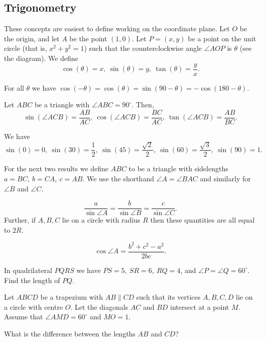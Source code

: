 \subsection{Trigonometry}
These concepts are easiest to define working on the coordinate plane. Let $O$ be
the origin, and let $A$ be the point $(1,0)$. 
Let $P=(x,y)$ be a point on the unit circle (that is, $x^2+y^2=1$) such that
the counterclockwise angle $\angle AOP$ is $\theta$ (see the diagram). We define
\[\cos(\theta)=x,\ \sin(\theta)=y,\ \tan(\theta)=\frac yx.\]
\begin{result}{\label{r:b:g:t:1}}
  For all $\theta$ we have
  $\cos(-\theta)=\cos(\theta)=\sin(90-\theta)=-\cos(180-\theta)$.
\end{result}
\begin{result}{\label{r:b:g:t:2}}
  Let $ABC$ be a triangle with $\angle ABC=90^\circ$. Then,
  \[\sin(\angle ACB)=\frac{AB}{AC},\ \cos(\angle ACB)=\frac{BC}{AC},\
    \tan(\angle ACB)=\frac{AB}{BC}.\]
\end{result}
\begin{result}{\label{r:b:g:t:3}}
  We have
  \[\sin(0)=0,\ \sin(30)=\frac 12,\ \sin(45)=\frac{\sqrt2}2,\
    \sin(60)=\frac{\sqrt3}2,\ \sin(90)=1.\]
\end{result}
For the next two results we define $ABC$ to be a triangle with sidelengths
$a=BC,\ b=CA,\ c=AB$. We use the shorthand $\angle A=\angle BAC$ and similarly
for $\angle B$ and $\angle C$.
\begin{result}[Extended Rule of Sines]{\label{r:b:g:t:4}}
  \[\frac a{\sin \angle A}=\frac b{\sin\angle B}=\frac c{\sin\angle C}.\]
  Further, if $A,B,C$ lie on a circle with radius $R$ then these quantities are
  all equal to $2R$.
\end{result}
\begin{result}{\label{r:b:g:t:5}}
  \[\cos\angle A=\frac{b^2+c^2-a^2}{2bc}.\]
\end{result}
\begin{problem}{\label{p:b:g:t:1}}
 In quadrilateral $PQRS$ we have $PS=5,\ SR=6,\ RQ=4$, and $\angle P=\angle
 Q=60^\circ$. Find the length of $PQ$.
\end{problem}
\begin{problem}{\label{p:b:g:t:2}}
  Let $ABCD$ be a trapezium with $AB\|CD$ such that its vertices $A,B,C,D$ lie
  on a circle with centre $O$. Let the diagonals $AC$ and $BD$ intersect at a
  point $M$. Assume that $\angle AMD=60^\circ$ and $MO=1$.

  What is the difference between the lengths $AB$ and $CD$?
\end{problem}
